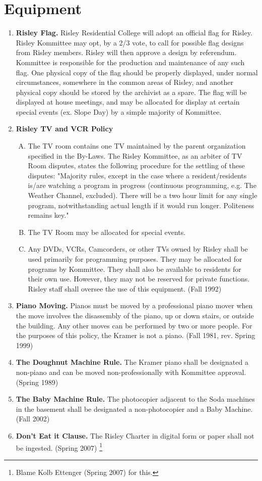 \documentclass[12pt]{article}
\begin{document}
\section*{Equipment}
\begin{enumerate}[1.]
\item \textbf{Risley Flag.} Risley Residential College will adopt an official flag for Risley. Risley Kommittee may opt, by a 2/3 vote, to call for possible flag designs from Risley members. Risley will then approve a design by referendum. Kommittee is responsible for the production and maintenance of any such flag. One physical copy of the flag should be properly displayed, under normal circumstances, somewhere in the common areas of Risley, and another physical copy should be stored by the archivist as a spare. The flag will be displayed at house meetings, and may be allocated for display at certain special events (ex. Slope Day) by a simple majority of Kommittee.
\item \textbf{Risley TV and VCR Policy}
\begin{enumerate}[A.] 
\item The TV room contains one TV maintained by the parent organization specified in the By-Laws. The Risley Kommittee, as an arbiter of TV Room disputes, states the following procedure for the settling of these disputes: "Majority rules, except in the case where a resident/residents is/are watching a program in progress (continuous programming, e.g. The Weather Channel, excluded). There will be a two hour limit for any single program, notwithstanding actual length if it would run longer. Politeness remains key." 
\item The TV Room may be allocated for special events.
\item Any DVDs, VCRs, Camcorders, or other TVs owned by Risley shall be used primarily for programming purposes. They may be allocated for programs by Kommittee. They shall also be available to residents for their own use. However, they may not be reserved for private functions. Risley staff shall oversee the use of this equipment. (Fall 1992)
\end{enumerate}
\item \textbf{Piano Moving.} Pianos must be moved by a professional piano mover when the move involves the disassembly of the piano, up or down stairs, or outside the building. Any other moves can be performed by two or more people. For the purposes of this policy, the Kramer is not a piano. (Fall 1981, rev. Spring 1999)
\item \textbf{The Doughnut Machine Rule.} The Kramer piano shall be designated a non-piano and can be moved non-professionally with Kommittee approval. (Spring 1989)
\item \textbf{The Baby Machine Rule.} The photocopier adjacent to the Soda machines in the basement shall be designated a non-photocopier and a Baby Machine. (Fall 2002)
\item \textbf{Don't Eat it Clause.} The Risley Charter in digital form or paper shall not be ingested. (Spring 2007) \footnote{Blame Kolb Ettenger (Spring 2007) for this.}
\end{enumerate}
\end{document}
